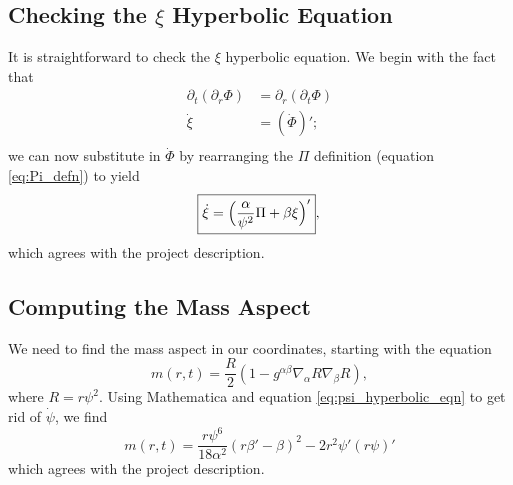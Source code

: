 \documentclass[12pt]{article}
\numberwithin{equation}{section}
\begin{document}
\subsection{Checking the $\xi$ Hyperbolic Equation}
It is straightforward to check the $\xi$ hyperbolic equation.  We begin with the fact that
\begin{equation}
\begin{aligned}
\partial_t (\partial_r \Phi) &= \partial_r (\partial_t \Phi) \\
\dot{\xi} &= (\dot{\Phi})'; \\
\end{aligned}
\end{equation}
we can now substitute in $\dot{\Phi}$ by rearranging the $\Pi$ definition (equation \ref{eq:Pi_defn}) to yield
\begin{equation}
\boxed{ \dot{\xi} = \Big( \frac{\alpha}{\psi^2} \Pi + \beta \xi \Big)' }, \\
\end{equation}
which agrees with the project description.

\subsection{Computing the Mass Aspect}
We need to find the mass aspect in our coordinates, starting with the equation
\begin{equation}
m(r, t) = \frac{R}{2} (1 - g^{\alpha \beta} \nabla_\alpha R \nabla_\beta R),
\end{equation}
where $R = r \psi^2$.  Using Mathematica and equation \ref{eq:psi_hyperbolic_eqn} to get rid of $\dot{\psi}$, we find
\begin{equation}
\boxed{m(r, t) = \frac{r \psi^6}{18 \alpha^2} (r \beta' - \beta)^2 - 2 r^2 \psi' (r \psi)'}
\end{equation}
which agrees with the project description.
\end{document}
